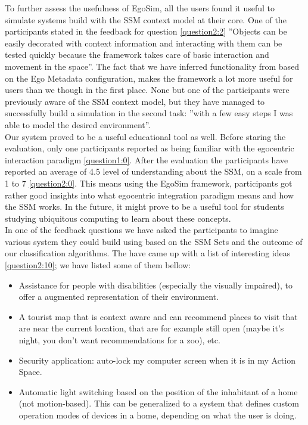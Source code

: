 To further assess the usefulness of EgoSim, all the users found it useful to simulate systems build with the SSM context model at their core. One of the participants stated in the feedback for question \ref{question2:2} ''Objects can be easily decorated with context information and interacting with them can be tested quickly because the framework takes care of basic interaction and movement in the space''. The fact that we have inferred functionality from based on the Ego Metadata configuration, makes the framework a lot more useful for users than we though in the first place. None but one of the participants were previously aware of the SSM context model, but they have managed to successfully build a simulation in the second task: ''with a few easy steps I was able to model the desired environment''.\\

Our system proved to be a useful educational tool as well. Before staring the evaluation, only one participants reported as being familiar with the egocentric interaction paradigm \ref{question1:0}. After the evaluation the participants have reported an average of 4.5 level of understanding about the SSM, on a scale from 1 to 7 \ref{question2:0}. This means using the EgoSim framework, participants got rather good insights into what egocentric integration paradigm means and how the SSM works. In the future, it might prove to be a useful tool for students studying ubiquitous computing to learn about these concepts.\\

In one of the feedback questions we have asked the participants to imagine various system they could build using based on the SSM Sets and the outcome of our classification algorithms. The have came up with a list of interesting ideas \ref{question2:10}; we have listed some of them bellow:
\begin{itemize}
	\item Assistance for people with disabilities (especially the visually impaired), to offer a augmented representation of their environment.
	\item A tourist map that is context aware and can recommend places to visit that are near the current location, that are for example still open (maybe it's night, you don't want recommendations for a zoo), etc.
	\item Security application: auto-lock my computer screen when it is in my Action Space.
	\item Automatic light switching based on the position of the inhabitant of a home (not motion-based). This can be generalized to a system that defines custom operation modes of devices in a home, depending on what the user is doing.
\end{itemize}

